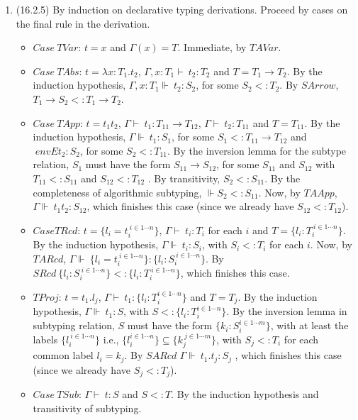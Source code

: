 \documentclass{article}
\newcommand{\env}{{\Gamma \vdash \ }}
\newcommand{\envE}{{\Gamma \Vdash \ }}
\begin{document}
\begin{enumerate}
\item (16.2.5) By induction on declarative typing derivations. Proceed by cases on the final rule in the derivation.
\begin{itemize}
\item $Case \ TVar$: $t = x$ and $\Gamma(x) = T$. Immediate, by $TAVar$.
\item $Case \ TAbs$: $t = \lambda x:T_1.t_2$, $\Gamma, x:T_1 \vdash \ t_2 : T_2$ and $T = T_1 \to T_2$. By the induction hypothesis, $\Gamma, x:T_1 \Vdash \ t_2:S_2$, for some $S_2 <: T_2$. By $SArrow$, $T_1 \to S_2 <: T_1 \to T_2$.
\item $Case \ TApp$: $t = t_1 t_2$, $\env t_1 : T_{11} \to T_{12}$, $\env t_2 : T_{11}$ and $T = T_{11}$. By the induction hypothesis, $\envE t_1 : S_1$, for some $S_1 <: T_{11} \to T_{12}$ and $\ envE t_2 :S_2$, for some $S_2 <: T_{11}$. By the inversion lemma for the subtype relation, $S_1$ must have the form $S_{11} \to S_{12}$, for some $S_{11}$ and $S_{12}$ with $T_{11} <: S_{11}$ and $S_{12} <: T_{12}$ . By transitivity, $S_2 <: S_{11}$. By the completeness of algorithmic subtyping, $\Vdash S_2 <: S_{11}$. Now, by $TAApp$, $\envE t_1 t_2 : S_{12}$, which finishes this case (since we already have $S_{12} <: T_{12}$).
\item $Case TRcd$: $t = \{ l_i = t_i ^ {\ i \in 1 \cdots n}\}$, $\env t_i : T_i$ for each $i$ and $T = \{ l_i:T_i ^ {\ i \in 1 \cdots n} \}$. By the induction hypothesis, $\envE t_i : S_i$, with $S_i <: T_i$ for each $i$. Now, by $TARcd$, $\envE \{ l_i = t_i ^ {\ i \in 1 \cdots n}\}: \{l_i:S_i ^ {\ i \in 1 \cdots n}\}$. By $SRcd \ \{l_i:S_i ^ {\ i \in 1 \cdots n}\} <: \{l_i:T_i ^ {\ i \in 1 \cdots n}\}$, which finishes this case.
\item $TProj$: $t = t_1 .l_j$, $\env t_1 : \{ l_i :T_i ^ {i\in 1 \cdots n} \}$ and $T = T_j$. By the induction hypothesis, $\envE t_1 : S$, with $S <: \{ l_i : T_i ^ {i\in 1 \cdots n} \}$. By the inversion lemma in subtyping relation, $S$ must have the form $\{ k_i : S_i ^ {i\in 1 \cdots m} \}$, with at least the labels $\{l_i ^ {\ i \in 1 \cdots n }\}$ i.e., $\{l_i ^ {i\in 1 \cdots n }\}  \subseteq \{k_j ^ {\ j \in 1 \cdots m} \}$,  with $S_j <: T_i$ for each common label $l_i = k_j $. By $SARcd$ $\envE t_1.t_j : S_j$ , which finishes this case (since we already have $S_j <: T_j$).
\item $Case \ TSub$: $ \env t : S$ and $S <: T$. By the induction hypothesis and transitivity of subtyping.
\end{itemize}

\end{enumerate}
\end{document}
